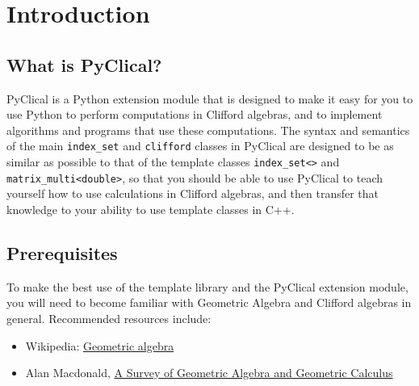 \chapter{Introduction}
\label{ch:intro_pyclical}

\section{What is PyClical?}
PyClical is a Python extension module that is designed to make it easy for you to use Python to perform computations in Clifford algebras, and to implement algorithms and programs that use these computations. The syntax and semantics of the main \texttt{index\_set} and \texttt{clifford} classes in PyClical are designed to be as similar as possible to that of the \glucat template classes \texttt{index\_set<>} and \texttt{matrix\_multi<double>}, so that you should be able to use PyClical to teach yourself how to use calculations in Clifford algebras, and then transfer that knowledge to your ability to use \glucat template classes in C++.

\section{Prerequisites}
To make the best use of the \glucat template library and the PyClical extension module, you will need to become familiar with Geometric Algebra and Clifford algebras in general.
Recommended resources include:
\begin{itemize}
    \item Wikipedia: \href{http://en.wikipedia.org/wiki/Geometric_algebra}{Geometric algebra}
    \item Alan Macdonald, \href{http://faculty.luther.edu/~macdonal/GA&GC.pdf}{A Survey of Geometric Algebra and Geometric Calculus}
\end{itemize}
